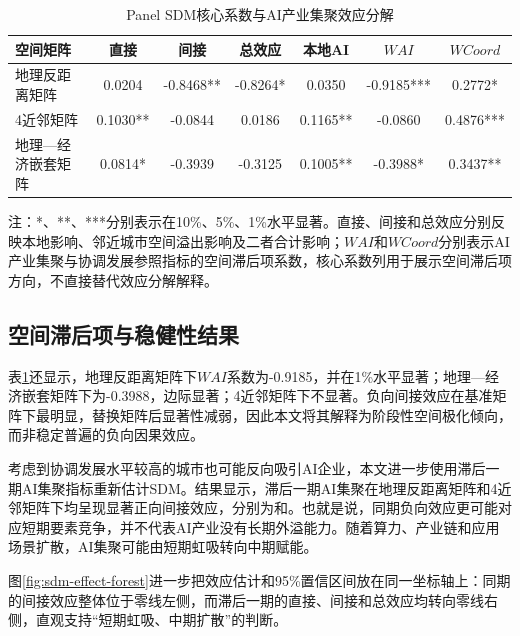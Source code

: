 \documentclass[12pt, a4paper]{ctexart}
\newcommand{\compacttableformat}{\footnotesize\setlength{\tabcolsep}{3pt}\renewcommand{\arraystretch}{1.15}}
\begin{document}
\begin{table}[htbp]
\centering
\begin{threeparttable}
\caption{Panel SDM核心系数与AI产业集聚效应分解}
\label{tab:sdm-ai-effects}
{\compacttableformat
\begin{tabular*}{\textwidth}{@{\extracolsep{\fill}}lcccccc}
\toprule
空间矩阵 & 直接 & 间接 & 总效应 & 本地AI & $WAI$ & $WCoord$ \\
\midrule
地理反距离矩阵 & 0.0204 & -0.8468** & -0.8264* & 0.0350 & -0.9185*** & 0.2772* \\
4近邻矩阵 & 0.1030** & -0.0844 & 0.0186 & 0.1165** & -0.0860 & 0.4876*** \\
地理—经济嵌套矩阵 & 0.0814* & -0.3939 & -0.3125 & 0.1005** & -0.3988* & 0.3437** \\
\bottomrule
\end{tabular*}
}
\begin{tablenotes}
\footnotesize
\item 注：*、**、***分别表示在10\%、5\%、1\%水平显著。直接、间接和总效应分别反映本地影响、邻近城市空间溢出影响及二者合计影响；$WAI$和$WCoord$分别表示AI产业集聚与协调发展参照指标的空间滞后项系数，核心系数列用于展示空间滞后项方向，不直接替代效应分解解释。
\end{tablenotes}
\end{threeparttable}
\end{table}

\subsection{空间滞后项与稳健性结果}
表\ref{tab:sdm-ai-effects}还显示，地理反距离矩阵下$WAI$系数为-0.9185，并在1\%水平显著；地理—经济嵌套矩阵下为-0.3988，边际显著；4近邻矩阵下不显著。负向间接效应在基准矩阵下最明显，替换矩阵后显著性减弱，因此本文将其解释为阶段性空间极化倾向，而非稳定普遍的负向因果效应。

考虑到协调发展水平较高的城市也可能反向吸引AI企业，本文进一步使用滞后一期AI集聚指标重新估计SDM。结果显示，滞后一期AI集聚在地理反距离矩阵和4近邻矩阵下均呈现显著正向间接效应，分别为{}和{}。也就是说，同期负向效应更可能对应短期要素竞争，并不代表AI产业没有长期外溢能力。随着算力、产业链和应用场景扩散，AI集聚可能由{\heiti 短期虹吸转向中期赋能}。

图\ref{fig:sdm-effect-forest}进一步把效应估计和95\%置信区间放在同一坐标轴上：同期的间接效应整体位于零线左侧，而滞后一期的直接、间接和总效应均转向零线右侧，直观支持{\heiti “短期虹吸、中期扩散”}的判断。
\end{document}
